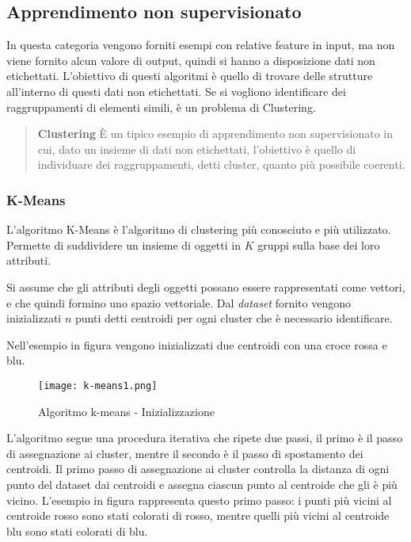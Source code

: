 \documentclass[../main.tex]{subfiles}
\begin{document}
\subsection{Apprendimento non supervisionato}
In questa categoria vengono forniti esempi con relative feature in input, ma non viene fornito alcun valore di output, quindi si hanno a disposizione dati non etichettati. L'obiettivo di questi algoritmi è quello di trovare delle strutture all'interno di questi dati non etichettati. Se si vogliono identificare dei raggruppamenti di elementi simili, è un problema di Clustering.

\begin{verse}
				\textbf{Clustering} È un tipico esempio di apprendimento non supervisionato in cui, dato un insieme di dati non etichettati, l'obiettivo è quello di individuare dei raggruppamenti, detti cluster, quanto più possibile coerenti.
\end{verse}	

\subsubsection{K-Means}
L'algoritmo K-Means è l'algoritmo di clustering più conosciuto e più utilizzato. Permette di suddividere un insieme di oggetti in $K$ gruppi sulla base dei loro attributi.

Si assume che gli attributi degli oggetti possano essere rappresentati come vettori, e che quindi formino uno spazio vettoriale. Dal \textit{dataset} fornito vengono inizializzati $n$ punti detti centroidi per ogni cluster che è necessario identificare.

Nell'esempio in figura vengono inizializzati due centroidi con una croce rossa e blu.

\begin{figure}[H]
				\centering
				\texttt{[image: k-means1.png]}
				\caption{Algoritmo k-means - Inizializzazione}
\end{figure}

L'algoritmo segue una procedura iterativa che ripete due passi, il primo è il passo di assegnazione ai cluster, mentre il secondo è il passo di spostamento dei centroidi.
Il primo passo di assegnazione ai cluster controlla la distanza di ogni punto del dataset dai centroidi e assegna ciascun punto al centroide che gli è più vicino. 
L'esempio in figura rappresenta questo primo passo: i punti più vicini al centroide rosso sono stati colorati di rosso, mentre quelli più vicini al centroide blu sono stati colorati di blu.
\end{document}
